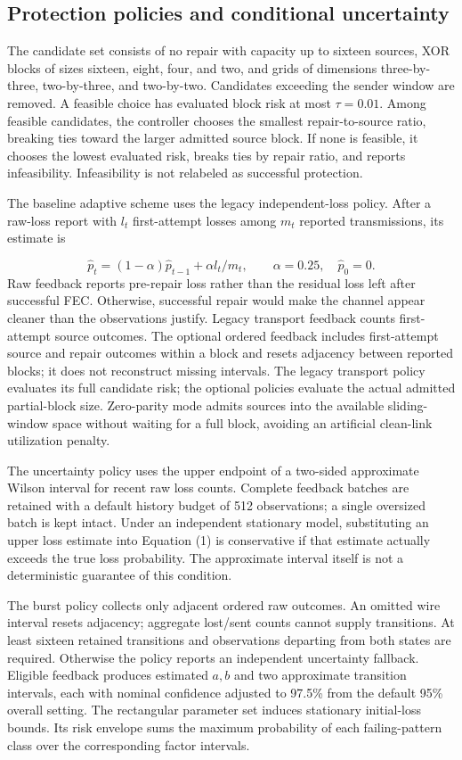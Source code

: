 \documentclass[11pt,a4paper]{article}
\begin{document}
\subsection{Protection policies and conditional uncertainty}
The candidate set consists of no repair with capacity up to sixteen sources, XOR blocks of sizes sixteen, eight, four, and two, and grids of dimensions three-by-three, two-by-three, and two-by-two. Candidates exceeding the sender window are removed. A feasible choice has evaluated block risk at most $\tau=0.01$. Among feasible candidates, the controller chooses the smallest repair-to-source ratio, breaking ties toward the larger admitted source block. If none is feasible, it chooses the lowest evaluated risk, breaks ties by repair ratio, and reports infeasibility. Infeasibility is not relabeled as successful protection.

The baseline adaptive scheme uses the legacy independent-loss policy. After a raw-loss report with $l_t$ first-attempt losses among $m_t$ reported transmissions, its estimate is

\[
\widehat p_t=(1-\alpha)\widehat p_{t-1}+\alpha l_t/m_t,\qquad \alpha=0.25,\quad\widehat p_0=0. \tag{3}
\]
Raw feedback reports pre-repair loss rather than the residual loss left after successful FEC. Otherwise, successful repair would make the channel appear cleaner than the observations justify. Legacy transport feedback counts first-attempt source outcomes. The optional ordered feedback includes first-attempt source and repair outcomes within a block and resets adjacency between reported blocks; it does not reconstruct missing intervals. The legacy transport policy evaluates its full candidate risk; the optional policies evaluate the actual admitted partial-block size. Zero-parity mode admits sources into the available sliding-window space without waiting for a full block, avoiding an artificial clean-link utilization penalty.

The uncertainty policy uses the upper endpoint of a two-sided approximate Wilson interval for recent raw loss counts. Complete feedback batches are retained with a default history budget of 512 observations; a single oversized batch is kept intact. Under an independent stationary model, substituting an upper loss estimate into Equation (1) is conservative if that estimate actually exceeds the true loss probability. The approximate interval itself is not a deterministic guarantee of this condition.

The burst policy collects only adjacent ordered raw outcomes. An omitted wire interval resets adjacency; aggregate lost/sent counts cannot supply transitions. At least sixteen retained transitions and observations departing from both states are required. Otherwise the policy reports an independent uncertainty fallback. Eligible feedback produces estimated $a,b$ and two approximate transition intervals, each with nominal confidence adjusted to 97.5\% from the default 95\% overall setting. The rectangular parameter set induces stationary initial-loss bounds. Its risk envelope sums the maximum probability of each failing-pattern class over the corresponding factor intervals.
\end{document}
